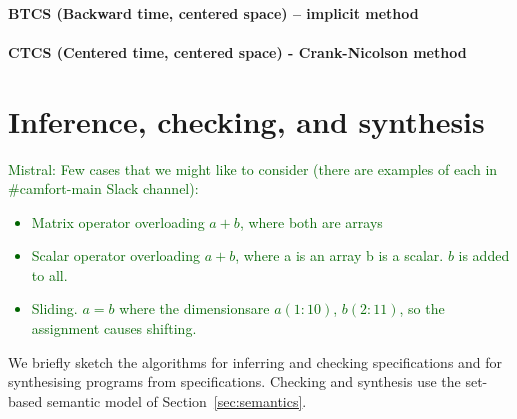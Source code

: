 \documentclass[9pt]{sigplanconf}
\newcommand{\mnote}[1]{\textcolor{darkgreen}{Mistral: #1}}
\theoremstyle{definition}
\begin{document}
\paragraph{BTCS (Backward time, centered space) -- implicit method}

\paragraph{CTCS (Centered time, centered space) - Crank-Nicolson method}

\section{Inference, checking, and synthesis}
\label{sec:analysis}

\mnote{Few cases that we might like to consider (there are examples
    of each in \#camfort-main Slack channel):
  \begin{itemize}
    \item Matrix operator overloading $a + b$, where both are arrays
    \item Scalar operator overloading $a + b$, where a is an array b is a
      scalar. $b$ is added to all.
    \item Sliding. $a = b$ where the dimensionsare $a(1:10)$, $b(2:11)$,
      so the assignment causes shifting.
  \end{itemize}
}

\noindent
We briefly sketch the algorithms for inferring and checking
specifications and for synthesising programs from specifications.
Checking and synthesis use the set-based semantic model of
Section~\ref{sec:semantics}. 

\newcommand{\neigh}{\textsf{neigh}}
\newcommand{\arrayTy}{\textsf{array}}
\newcommand{\rhsExp}{\textsf{rhsExp}}
\newcommand{\var}{\textsf{var}}

\newcommand{\vect}[1]{\textbf{#1}}
\newcommand{\vtwo}[2]{\setlength{\arraycolsep}{0em}
\left[\begin{array}{l}$#1$\\$#2$\end{array}\right]}
\newcommand{\stwo}[4]
{\setlength{\arraycolsep}{0.1em}
\left[\begin{array}{rr}$#1$ & $#3$\\$#2$ & $#4$\end{array}\right]}

\newcommand{\containedin}{\sqsubseteq}
\end{document}
